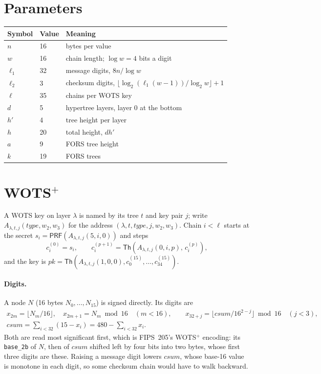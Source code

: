 \documentclass[11pt]{article}
\newcommand{\Th}{\mathsf{Th}}
\newcommand{\PRF}{\mathsf{PRF}}
\begin{document}
\section{Parameters}
\label{sec:parameters}

\begin{center}
\begin{tabular}{@{}lll@{}}
\toprule
Symbol & Value & Meaning\\
\midrule
$n$ & 16 & bytes per value\\
$w$ & 16 & chain length; $\log w=4$ bits a digit\\
$\ell_1$ & 32 & message digits, $8n/\log w$\\
$\ell_2$ & 3 & checksum digits, $\lfloor\log_2(\ell_1(w-1))/\log_2 w\rfloor+1$\\
$\ell$ & 35 & chains per WOTS key\\
$d$ & 5 & hypertree layers, layer 0 at the bottom\\
$h'$ & 4 & tree height per layer\\
$h$ & 20 & total height, $dh'$\\
$a$ & 9 & FORS tree height\\
$k$ & 19 & FORS trees\\
\bottomrule
\end{tabular}
\end{center}

\section{WOTS$^+$}
\label{sec:wots}

A WOTS key on layer $\lambda$ is named by its tree $t$ and key pair $j$; write
$A_{\lambda,t,j}(\mathit{type},w_2,w_3)$ for the address $(\lambda,t,\mathit{type},j,w_2,w_3)$.
Chain $i<\ell$ starts at the secret $s_i=\PRF(A_{\lambda,t,j}(5,i,0))$ and steps
\[
  c_i^{(0)}=s_i,\qquad c_i^{(p+1)}=\Th\!\left(A_{\lambda,t,j}(0,i,p),\,c_i^{(p)}\right),
\]
and the key is $\mathit{pk}=\Th(A_{\lambda,t,j}(1,0,0),c_0^{(15)},\dots,c_{34}^{(15)})$.

\paragraph{Digits.}
A node $N$ (16 bytes $N_0,\dots,N_{15}$) is signed directly. Its digits are
\begin{gather*}
  x_{2m}=\lfloor N_m/16\rfloor,\quad x_{2m+1}=N_m\bmod 16\quad(m<16),\qquad
  x_{32+j}=\lfloor\mathit{csum}/16^{2-j}\rfloor\bmod 16\quad(j<3),\\
  \mathit{csum}=\sum_{i<32}(15-x_i)=480-\sum_{i<32}x_i.
\end{gather*}
Both are read most significant first, which is FIPS~205's WOTS$^+$ encoding: its \texttt{base\_2b} of $N$, then of $\mathit{csum}$ shifted left by four bits into two bytes, whose first three digits are these. Raising a message digit lowers $\mathit{csum}$, whose base-16 value is monotone in each digit, so some checksum chain would have to walk backward.
\end{document}
